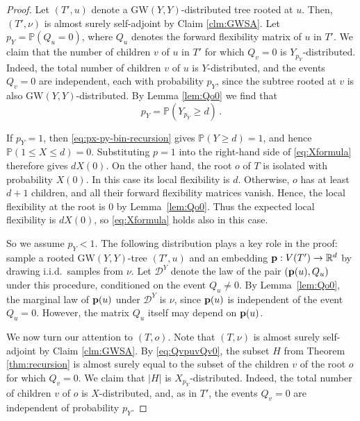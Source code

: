 \documentclass[10pt,a4paper]{amsart}
\numberwithin{equation}{section}
\renewcommand{\P}{\mathbb P}
\newcommand{\R}{\mathbb R}
\newcommand{\cD}{\mathcal D}
\newcommand{\p}{{\bf p}}
\begin{document}
\begin{proof}
Let $(T',u)$ denote a $\mathrm{GW}(Y,Y)$-distributed tree rooted at $u$. Then, $(T',\nu)$ is almost surely self-adjoint by Claim \ref{clm:GWSA}. 
Let $p_Y=\P(Q_u=0)$, where $Q_u$ denotes the forward flexibility matrix of $u$ in $T'$. 
We claim that the number of children $v$ of $u$ in $T'$ for which $Q_v=0$ is $Y_{p_Y}$-distributed. 
Indeed, the total number of children $v$ of $u$ is $Y$-distributed, and the events $Q_v=0$ are independent, each with probability $p_Y$, since the subtree rooted at $v$ is also $\mathrm{GW}(Y,Y)$-distributed.
By Lemma \ref{lem:Qo0} we find that 
\begin{equation}\label{eq:px-py-bin-recursion}
p_Y=\P\!\left(Y_{p_Y}\ge d\right)\,.
\end{equation}

If \(p_Y=1\), then \eqref{eq:px-py-bin-recursion} gives
\(\mathbb P(Y\ge d)=1\), and hence
    $\mathbb P(1\le X\le d)=0$.
Substituting \(p=1\) into the right-hand side of
\eqref{eq:Xformula} therefore gives \(dX(0)\).
On the other hand, the root \(o\) of \(T\) is isolated with probability
\(X(0)\). In this case its local flexibility is \(d\). Otherwise, \(o\)
has at least \(d+1\) children, and all their forward flexibility matrices
vanish. Hence, the local flexibility at the root is \(0\) by
Lemma~\ref{lem:Qo0}. Thus the expected local flexibility is \(dX(0)\),
so \eqref{eq:Xformula} holds also in this case.

So we assume $p_Y<1$. The following distribution plays a key role in the proof: sample a rooted $\mathrm{GW}(Y,Y)$-tree $(T',u)$ and an embedding $\p:V(T')\to\R^d$ by drawing i.i.d.\ samples from $\nu$. Let $\cD^Y$ denote the law of the pair $(\p(u),Q_u)$ under this procedure, conditioned on the event $Q_u\neq 0$.
By Lemma~\ref{lem:Qo0}, the marginal law of $\p(u)$ under $\cD^Y$ is $\nu$, since $\p(u)$ is independent of the event $Q_u=0$. 
However, the matrix $Q_u$ itself may depend on $\p(u)$.

\medskip


We now turn our attention to $(T,o)$. Note that $(T,\nu)$ is almost surely self-adjoint by Claim \ref{clm:GWSA}. 
By \eqref{eq:QvpuvQv0}, the subset $H$ from Theorem \ref{thm:recursion} is almost surely equal to the subset of the children $v$ of the root $o$ for which $Q_v=0$. We claim that $|H|$ is $X_{p_Y}$-distributed. Indeed, the total number of children $v$ of $o$ is $X$-distributed, and, as in $T'$, the events $Q_v=0$ are independent of probability $p_Y$. 


\end{proof}
\end{document}
